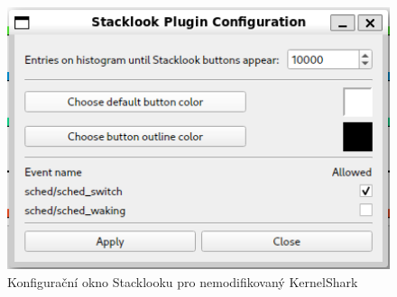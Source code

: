 \begin{figure}[p]\centering
    \includegraphics[width=140mm]{img/Stacklook/SlUnmodifiedKsharkConfigWindow}
    \caption{Konfigurační okno Stacklooku pro nemodifikovaný KernelShark}
    \label{SlUnmodifiedKsharkConfigWindow}
\end{figure}

